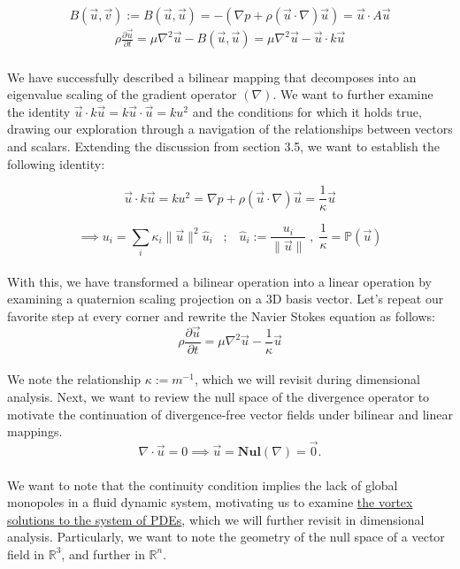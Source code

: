 \documentclass[12pt]{article}
\begin{document}
\[
B(\vec{u}, \vec{v}) := B(\vec{u}, \vec{u}) = -(\nabla p + \rho (\vec{u} \cdot \nabla) \vec{u}) = \vec u \cdot A \vec u
\]
\begin{align*}
\rho \frac{\partial \vec{u}}{\partial t} = \mu \nabla^2 \vec{u} - B(\vec{u}, \vec{u}) = \mu \nabla^{2} \vec u - \vec u \cdot k \vec u
\end{align*} \\
We have successfully described a bilinear mapping that decomposes into an eigenvalue scaling of the gradient operator $(\nabla)$. We want to further examine the identity $\vec u \cdot k \vec u = k \vec u \cdot \vec u = ku^{2}$ and the conditions for which it holds true, drawing our exploration through a navigation of the relationships between vectors and scalars. Extending the discussion from section 3.5, we want to establish the following identity:

\[
\vec u \cdot k \vec u = ku^{2}= \nabla p + \rho (\vec u \cdot \nabla) \vec u = \frac{1}{\kappa} \vec u
\]

\[
\implies u_{i} = \sum_{i} \kappa_{i} \|\vec u\|^{2} \hat u_{i} \;\;\;;\;\;\; \hat u_{i} := \frac{u_{i}}{\|\vec u\|}  \;,\; \frac{1}{\kappa} = \mathbb{P} (\vec u)
\] \\ 
With this, we have transformed a bilinear operation into a linear operation by examining a quaternion scaling projection on a 3D basis vector. Let's repeat our favorite step at every corner and rewrite the Navier Stokes equation as follows: \\ 

\[
\rho \frac{\partial \vec{u}}{\partial t} = \mu \nabla^2 \vec{u} - \frac{1}{\kappa} \vec u
\] \\
We note the relationship $\kappa := m^{-1}$, which we will revisit during dimensional analysis. Next, we want to review the null space of the divergence operator to motivate the continuation of divergence-free vector fields under bilinear and linear mappings. \\ 
\[
\nabla \cdot \vec{u} = 0 \implies \vec u = \mathbf{Nul}(\nabla) = \vec 0 . 
\] \\ 
We want to note that the continuity condition implies the lack of global monopoles in a fluid dynamic system, motivating us to examine \href{https://www.diva-portal.org/smash/get/diva2:205082/fulltext01.pdf}{the vortex solutions to the system of PDEs}, which we will further revisit in dimensional analysis. Particularly, we want to note the geometry of the null space of a vector field in $\mathbb{R}^{3}$, and further in $\mathbb{R}^{n}$.
\end{document}
